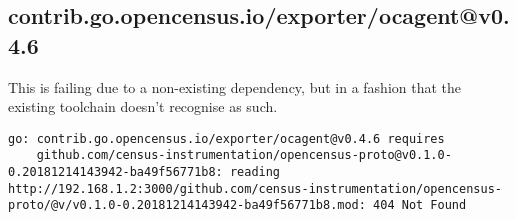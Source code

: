 \subsection{contrib.go.opencensus.io/exporter/ocagent@v0.4.6}

This is failing due to a non-existing dependency, but in a fashion that the existing toolchain doesn't recognise as such.

\begin{verbatim}
go: contrib.go.opencensus.io/exporter/ocagent@v0.4.6 requires
	github.com/census-instrumentation/opencensus-proto@v0.1.0-0.20181214143942-ba49f56771b8: reading http://192.168.1.2:3000/github.com/census-instrumentation/opencensus-proto/@v/v0.1.0-0.20181214143942-ba49f56771b8.mod: 404 Not Found
\end{verbatim}
